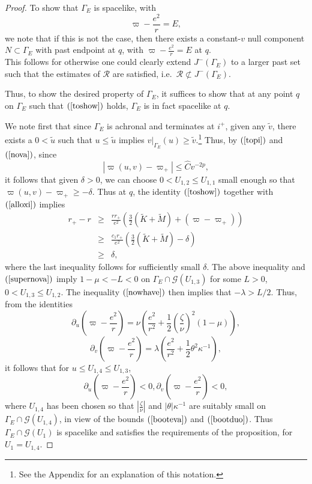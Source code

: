 \documentclass{article}
\newcommand{\zn}{\frac{\zeta}{\nu}}
\begin{document}
{\begin{proof}
To show that $\Gamma_{E}$
is spacelike, with
\begin{equation}
\label{toshow}
\varpi-\frac{e^2}r=E,
\end{equation}
we note that if this is not the case,
then there exists a constant-$v$ null component $N\subset \Gamma_{E}$
with past endpoint at $q$, with $\varpi-\frac{e^2}r=E$ at $q$.
\[

\]
This follows for otherwise one could clearly extend $J^-(\Gamma_E)$
to a larger past set such that the estimates of $\mathcal{R}$ are satisfied,
i.e.~$\mathcal{R}\not\subset J^-(\Gamma_E)$.

Thus, to show the desired property of $\Gamma_{E}$,
it suffices to show that
at any point $q$ on $\Gamma_{E}$ such that
$(\ref{toshow})$ holds, $\Gamma_{E}$ is in fact spacelike
at $q$.

We note first that since $\Gamma_{E}$ is achronal
and terminates at $i^+$, given any $\tilde{v}$, there exists
a $0<\tilde{u}$ 
such that $u\le \tilde{u}$ implies $v|_{\Gamma_E}(u)\ge\tilde{v}$.\footnote{See
the Appendix for an explanation of this notation.}
Thus, by $(\ref{topi})$ and $(\ref{nova})$, 
since
\begin{equation}
\label{supernova}
|\varpi(u,v)-\varpi_+|\le\hat{C}v^{-2p},
\end{equation}
it follows that given $\delta>0$,
we can choose $0<U_{1,2}\le U_{1,1}$ small enough so that
$\varpi(u,v)-\varpi_+\ge -\delta$.
Thus at $q$, the identity
$(\ref{toshow})$ together with $(\ref{alloxi})$
implies 
\begin{eqnarray*}
r_+-r&\ge&\frac{rr_+}{e^2}\left(\frac32(\tilde{K}+\tilde{M})
+(\varpi-\varpi_+)\right)\\
&\ge&\frac{c_1r_+}{e^2}\left(\frac32(\tilde{K}+\tilde{M})-\delta\right)\\
&\ge&\delta,
\end{eqnarray*}
where the last inequality follows for sufficiently small $\delta$.
The above inequality and $(\ref{supernova})$ imply 
$1-\mu<-L<0$ on $\Gamma_{E}\cap\mathcal{G}(U_{1,3})$ for some $L>0$,
$0<U_{1,3}\le U_{1,2}$.
The inequality $(\ref{nowhave})$ then implies that $-\lambda>L/2$.
Thus, from the identities
\[
\partial_u\left(\varpi-\frac{e^2}r\right)
=\nu\left(\frac{e^2}{r^2}+\frac12\left(\zn\right)^2(1-\mu)\right),
\]
\[
\partial_v\left(\varpi-\frac{e^2}r\right)
=\lambda\left(\frac{e^2}{r^2}+\frac12\theta^2\kappa^{-1}\right),
\]
it follows that for $u\le U_{1,4}\le U_{1,3}$,
\[
\partial_u\left(\varpi-\frac{e^2}r\right)<0,
\partial_v\left(\varpi-\frac{e^2}r\right)<0,
\]
where $U_{1,4}$ has been chosen so that $\left|\zn\right|$
and $|\theta|\kappa^{-1}$ are suitably small on 
$\Gamma_{E}\cap\mathcal{G}(U_{1,4})$,
in view of the bounds $(\ref{booteva})$ and $(\ref{bootduo})$.
Thus $\Gamma_{E}\cap\mathcal{G}(U_1)$ 
is spacelike and satisfies the requirements
of the proposition, for $U_1=U_{1,4}$. 


\end{proof}}
\end{document}
